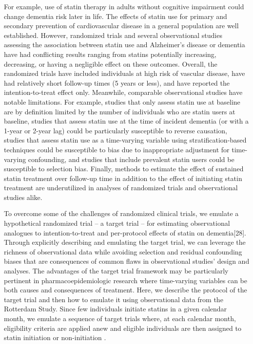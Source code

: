 \documentclass[
]{book}
\begin{document}
For example, use of statin therapy in adults without cognitive impairment could change dementia risk later in life. The effects of statin use for primary and secondary prevention of cardiovascular disease in a general population are well established\autocite{naci2013,taylor2013,udell2006}. However, randomized trials\autocite{mrc2002,trompet2010} and several observational studies assessing the association between statin use and Alzheimer's disease or dementia have had conflicting results ranging from statins potentially increasing, decreasing, or having a negligible effect on these outcomes. Overall, the randomized trials have included individuals at high risk of vascular disease, have had relatively short follow-up times (5 years or less), and have reported the intention-to-treat effect only\autocite{mrc2002,trompet2010}. Meanwhile, comparable observational studies have notable limitations\autocite{power2015}. For example, studies that only assess statin use at baseline are by definition limited by the number of individuals who are statin users at baseline\autocite{arvanitakis2008,szwast2007,zandi2005,ancelin2012,smeeth2009,wolozin2007}, studies that assess statin use at the time of incident dementia (or with a 1-year or 2-year lag) could be particularly susceptible to reverse causation\autocite{haag2009,cramer2008,bettermann2012,beydoun2011,li2004,li2010,rea2005}, studies that assess statin use as a time-varying variable using stratification-based techniques could be susceptible to bias due to inappropriate adjustment for time-varying confounding\autocite{bettermann2012,beydoun2011,bernick2005,sparks2008,steenland2013,starr2004,cox2010}, and studies that include prevalent statin users could be susceptible to selection bias\autocite{arvanitakis2008,szwast2007,zandi2005,ancelin2012,wolozin2007,haag2009,cramer2008,beydoun2011,li2004,li2010,rea2005,bernick2005,steenland2013,starr2004}. Finally, methods to estimate the effect of sustained statin treatment over follow-up time in addition to the effect of initiating statin treatment are underutilized in analyses of randomized trials and observational studies alike\autocite{ray2003}.

To overcome some of the challenges of randomized clinical trials, we emulate a hypothetical randomized trial -- a target trial -- for estimating observational analogues to intention-to-treat and per-protocol effects of statin on dementia{[}28{]}. Through explicitly describing and emulating the target trial, we can leverage the richness of observational data while avoiding selection and residual confounding biases that are consequences of common flaws in observational studies' design and analyses. The advantages of the target trial framework may be particularly pertinent in pharmacoepidemiologic research where time-varying variables can be both causes and consequences of treatment. Here, we describe the protocol of the target trial and then how to emulate it using observational data from the Rotterdam Study. Since few individuals initiate statins in a given calendar month, we emulate a sequence of target trials where, at each calendar month, eligibility criteria are applied anew and eligible individuals are then assigned to statin initiation or non-initiation \autocite{danaei2013,danaei2018}.
\end{document}
